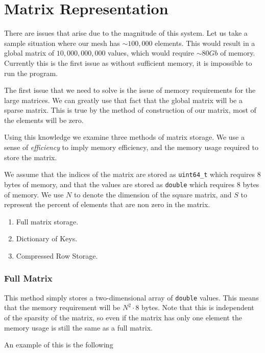 \documentclass[../fem.tex]{subfile}
\begin{document}
\section{Matrix Representation}%
\label{sec:matrix_representation}

There are issues that arise due to the magnitude of this system. Let us take a
sample situation where our mesh has $\sim 100,000$ elements. This would result
in a global matrix of $10,000,000,000$ values, which would require $\sim 80Gb$
of memory. Currently this is the first issue as without sufficient memory, it
is impossible to run the program.

The first issue that we need to solve is the issue of memory requirements for
the large matrices. We can greatly use that fact that the global matrix will
be a sparse matrix. This is true by the method of construction of our matrix,
most of the elements will be zero.

Using this knowledge we examine three methods of matrix storage. We use a sense
of \textit{efficiency} to imply memory efficiency, and the memory usage required
to store the matrix.

We assume that the indices of the matrix are stored as
\texttt{uint64_t} which requires $8$ bytes of memory, and that the
values are stored as \texttt{double} which requires $8$ bytes of
memory. We use $N$ to denote the dimension of the square matrix, and $S$ to
represent the percent of elements that are non zero in the matrix.

\begin{enumerate}[label=\arabic*.]
  \item Full matrix storage.
  \item Dictionary of Keys.
  \item Compressed Row Storage.
\end{enumerate}

\subsubsection{Full Matrix}%
\label{ssub:full_matrix}

This method simply stores a two-dimensional array of \texttt{double}
values. This means that the memory requirement will be $N^2\cdot 8$ bytes. Note
that this is independent of the sparsity of the matrix, so even if the matrix
has only one element the memory usage is still the same as a full matrix.

An example of this is the following
\end{document}
